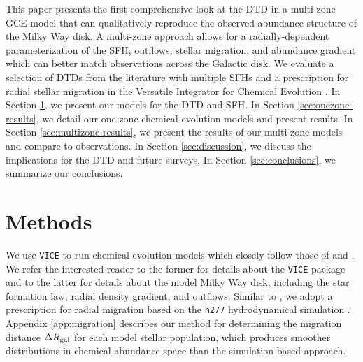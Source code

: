 \documentclass[twocolumn,twocolappendix,linenumbers,trackchanges]{aastex631}
\newcommand{\vice}{{\tt VICE}\xspace}
\begin{document}

This paper presents the first comprehensive look at the DTD in a multi-zone GCE model that can qualitatively reproduce the observed abundance structure of the Milky Way disk. A multi-zone approach allows for a radially-dependent parameterization of the SFH, outflows, stellar migration, and abundance gradient which can better match observations across the Galactic disk. We evaluate a selection of DTDs from the literature with multiple SFHs and a prescription for radial stellar migration in the Versatile Integrator for Chemical Evolution \citep[\vice;][]{JohnsonWeinberg2020-Starbursts}. In Section \ref{sec:methods}, we present our models for the DTD and SFH. In Section \ref{sec:onezone-results}, we detail our one-zone chemical evolution models and present results. In Section \ref{sec:multizone-results}, we present the results of our multi-zone models and compare to observations. In Section \ref{sec:discussion}, we discuss the implications for the DTD and future surveys. In Section \ref{sec:conclusions}, we summarize our conclusions.

\section{Methods}
\label{sec:methods}

We use \vice to run chemical evolution models which closely follow those of \citet{JohnsonWeinberg2020-Starbursts} and \citet[][hereafter ]{Johnson2021-Migration}. We refer the interested reader to the former for details about the \vice package and to the latter for details about the model Milky Way disk, including the star formation law, radial density gradient, and outflows. Similar to , we adopt a prescription for radial migration based on the {\tt h277} hydrodynamical simulation \citep{Christensen2012-h277}. Appendix \ref{app:migration} describes our method for determining the migration distance $\Delta R_{\rm gal}$ for each model stellar population, which produces smoother distributions in chemical abundance space than the simulation-based approach.
\end{document}
